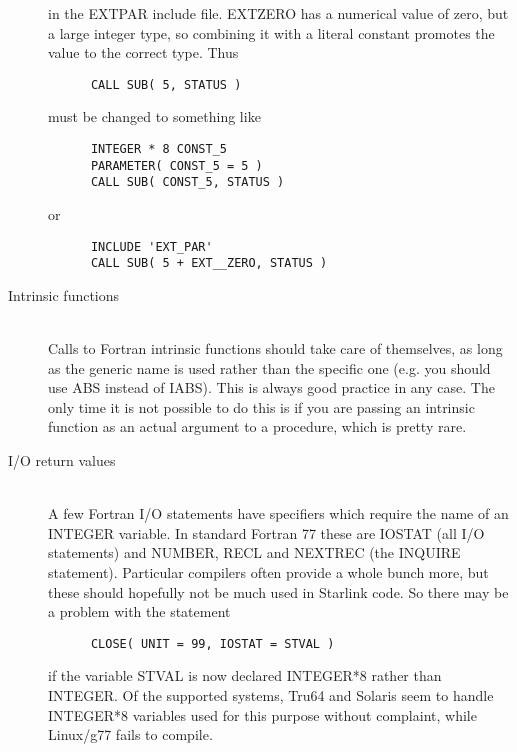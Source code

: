 \documentclass[twoside,11pt]{article}
\renewcommand{\_}{\texttt{\symbol{95}}}
\begin{document}
\begin{description}
in the EXT\_PAR include file.  EXT\_\_ZERO has a numerical value of 
zero, but a large integer type, so combining it with
a literal constant promotes the value to the correct type.
Thus
\begin{squote}
\begin{verbatim}
      CALL SUB( 5, STATUS )
\end{verbatim}
\end{squote}
must be changed to something like
\begin{squote}
\begin{verbatim}
      INTEGER * 8 CONST_5
      PARAMETER( CONST_5 = 5 )
      CALL SUB( CONST_5, STATUS )
\end{verbatim}
\end{squote}
or
\begin{squote}
\begin{verbatim}
      INCLUDE 'EXT_PAR'
      CALL SUB( 5 + EXT__ZERO, STATUS )
\end{verbatim}
\end{squote}
%
\item[Intrinsic functions]\mbox{}
\\
Calls to Fortran intrinsic functions should take care of themselves,
as long as the generic name is used rather than the specific one
(e.g. you should use ABS instead of IABS).  This is always good
practice in any case.  The only time it is not possible to do 
this is if you are passing an intrinsic function as an actual
argument to a procedure, which is pretty rare.
%
\item[I/O return values]\mbox{}
\\
A few Fortran I/O statements have specifiers which require the name
of an INTEGER variable.  In standard Fortran 77 these are 
IOSTAT (all I/O statements) and 
NUMBER, RECL and NEXTREC (the INQUIRE statement).
Particular compilers often provide a whole bunch more, but these
should hopefully not be much used in Starlink code.
So there may be a problem with the statement
\begin{squote}
\begin{verbatim}
      CLOSE( UNIT = 99, IOSTAT = STVAL )
\end{verbatim}
\end{squote}
if the variable STVAL is now declared INTEGER*8 rather than INTEGER.
Of the supported systems, Tru64 and Solaris seem to handle 
INTEGER*8 variables used for this purpose without complaint,
while Linux/g77 fails to compile.
%
\end{description}
\end{document}
